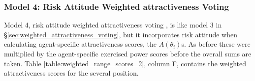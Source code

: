 %
%
%
%
%
\subsubsection{Model 4: Risk Attitude Weighted   {attractiveness} Voting\label{sec:weighted_attractiveness_voting_2}}

Model 4, risk attitude weighted   {attractiveness} voting \cite[page 12]{wise_ben_3June2014}, is like  model 3 in \S\ref{sec:weighted_attractiveness_voting}, but it incorporates risk attitude when calculating agent-specific   {attractiveness} scores, the $A(\theta_i)$s. As before  these were multiplied by the agent-specific   {exercised power} scores before the overall sums are taken. Table \ref{table:weighted_range_scores_2}, column F, contains the weighted   {attractiveness} scores for the several   {position}. 


